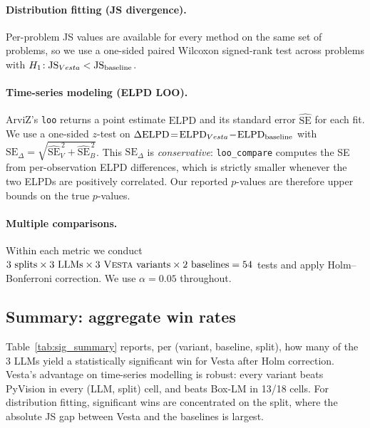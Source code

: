 \documentclass{article}
\newcommand{\method}{{\sc Vesta}}
\newcommand{\splitlabel}[3]{%
  \tikz[baseline=-0.6ex]{%
    \node[
      rounded corners=3pt,
      fill=#2,
      draw=#1,
      line width=0.8pt,
      inner xsep=4pt,
      inner ysep=2pt,
      font=\bfseries\small
    ] {#3};%
  }%
}
\newcommand{\Hard}{\splitlabel{hardred}{hardfill}{Hard}}
\begin{document}
\paragraph{Distribution fitting (JS divergence).} Per-problem JS values are available 
for every method on the same set of problems, so we use a one-sided paired Wilcoxon 
signed-rank test across problems with $H_1\!:\mathrm{JS}_{\method} < \mathrm{JS}_{\text{baseline}}$.

\paragraph{Time-series modeling (ELPD LOO).} ArviZ's \texttt{loo} returns a point 
estimate $\widehat{\mathrm{ELPD}}$ and its standard error $\widehat{\mathrm{SE}}$ for each 
fit. We use a one-sided $z$-test on 
$\Delta\mathrm{ELPD} \!=\! \mathrm{ELPD}_{\method} \!-\! \mathrm{ELPD}_{\text{baseline}}$ with 
$\mathrm{SE}_\Delta = \sqrt{\widehat{\mathrm{SE}}_V^{\,2} + \widehat{\mathrm{SE}}_B^{\,2}}$. 
This $\mathrm{SE}_\Delta$ is \emph{conservative}: \texttt{loo\_compare} computes the SE 
from per-observation ELPD differences, which is strictly smaller whenever the two ELPDs 
are positively correlated. Our reported 
$p$-values are therefore upper bounds on the true $p$-values.

\paragraph{Multiple comparisons.} Within each metric we conduct $3 \text{ splits} 
\times 3 \text{ LLMs} \times 3 \text{ \method{} variants} \times 2 \text{ baselines} 
= 54$ tests and apply Holm--Bonferroni correction. We use $\alpha = 0.05$ throughout.

\subsection{Summary: aggregate win rates}

Table~\ref{tab:sig_summary} reports, per (variant, baseline, split), how many of the 
3 LLMs yield a statistically significant win for \method{} after Holm correction. 
\method{}'s advantage on time-series modelling is robust: every variant beats PyVision 
in every (LLM, split) cell, and beats Box-LM in 13/18 cells. For distribution fitting, 
significant wins are concentrated on the \Hard{} split, where the absolute JS gap 
between \method{} and the baselines is largest.
\end{document}
